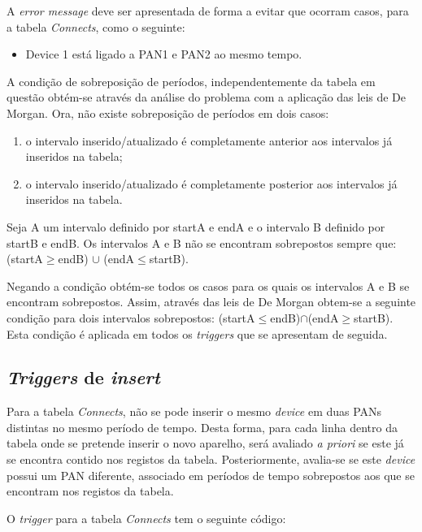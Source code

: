 \documentclass[a4paper]{article}
\begin{document}
A \textit{error message} deve ser apresentada de forma a evitar que ocorram casos,  para a tabela \textit{Connects}, como o seguinte: 

\begin{itemize}

\item Device 1 está ligado a PAN1 e PAN2 ao mesmo tempo.

\end{itemize}

A condição de sobreposição de períodos, independentemente da tabela em questão obtém-se através da análise do problema com a aplicação das leis de De Morgan. Ora, não existe sobreposição de períodos em dois casos:
\begin{enumerate}
\item o intervalo inserido/atualizado é completamente anterior aos intervalos já inseridos na tabela;
\item o intervalo inserido/atualizado é completamente posterior aos intervalos já inseridos na tabela.
\end{enumerate}

Seja A um intervalo definido por startA e endA e o intervalo B definido por startB e endB. Os intervalos A e B não se encontram sobrepostos sempre que: (startA$\geq$endB) $\cup$ (endA$\leq$startB).

Negando a condição obtém-se todos os casos para os quais os intervalos A e B se encontram sobrepostos. Assim, através das leis de De Morgan obtem-se a seguinte condição para dois intervalos sobrepostos: (startA$\leq$endB)$\cap$(endA$\geq$startB). Esta condição é aplicada em todos os \textit{triggers} que se apresentam de seguida.

\subsection{\textit{Triggers} de \textit{insert}}
Para a tabela \textit{Connects}, não se pode inserir o mesmo \textit{device} em duas PANs distintas no mesmo período de tempo. Desta forma, para cada linha dentro da tabela onde se pretende inserir o novo aparelho, será avaliado \textit{a priori} se este já se encontra contido nos registos da tabela. Posteriormente, avalia-se se este \textit{device} possui um PAN diferente, associado em períodos de tempo sobrepostos aos que se encontram nos registos da tabela.

O \textit{trigger} para a tabela \textit{Connects} tem o seguinte código:
\end{document}
